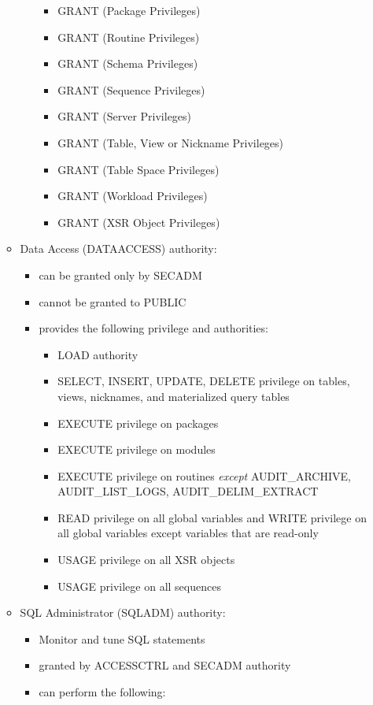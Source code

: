 \documentclass{article}
\begin{document}
\begin{itemize}
\begin{itemize}
\begin{itemize}
\begin{itemize}
		\item GRANT (Package Privileges)
		\item GRANT (Routine Privileges)
		\item GRANT (Schema Privileges)
		\item GRANT (Sequence Privileges)
		\item GRANT (Server Privileges)
		\item GRANT (Table, View or Nickname Privileges)
		\item GRANT (Table Space Privileges)
		\item GRANT (Workload Privileges)
		\item GRANT (XSR Object Privileges)
		\end{itemize}
	\end{itemize}
\item Data Access (DATAACCESS) authority:
	\begin{itemize}
	\item can be granted only by SECADM
	\item cannot be granted to PUBLIC
	\item provides the following privilege and authorities:
		\begin{itemize}
		\item LOAD authority
		\item SELECT, INSERT, UPDATE, DELETE privilege on tables, views, nicknames, and 
		materialized query tables
		\item EXECUTE privilege on packages
		\item EXECUTE privilege on modules
		\item EXECUTE privilege on routines \textit{except} AUDIT\_ARCHIVE, AUDIT\_LIST\_LOGS,
		AUDIT\_DELIM\_EXTRACT
		\item READ privilege on all global variables and WRITE privilege on all global variables except
		variables that are read-only
		\item USAGE privilege on all XSR objects
		\item USAGE privilege on all sequences
		\end{itemize}
	\end{itemize}
\item SQL Administrator (SQLADM) authority:
	\begin{itemize}
	\item Monitor and tune SQL statements
	\item granted by ACCESSCTRL and SECADM authority
	\item can perform the following:

\end{itemize}
\end{itemize}
\end{itemize}
\end{document}
